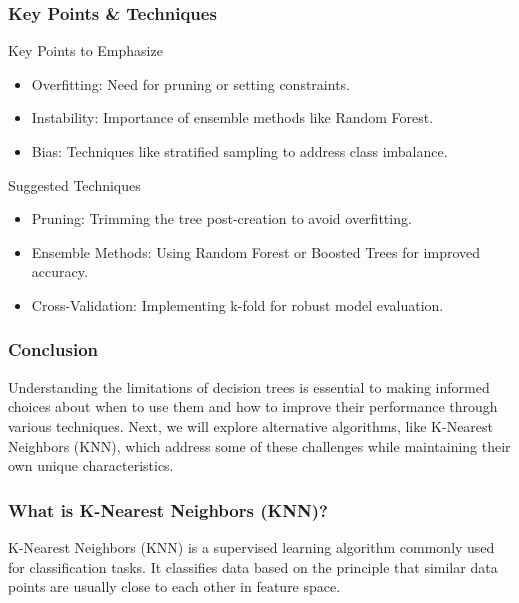 \documentclass[aspectratio=169]{beamer}
\begin{document}
\begin{frame}[fragile]
    \frametitle{Key Points & Techniques}
    \begin{block}{Key Points to Emphasize}
        \begin{itemize}
            \item Overfitting: Need for pruning or setting constraints.
            \item Instability: Importance of ensemble methods like Random Forest.
            \item Bias: Techniques like stratified sampling to address class imbalance.
        \end{itemize}
    \end{block}

    \begin{block}{Suggested Techniques}
        \begin{itemize}
            \item Pruning: Trimming the tree post-creation to avoid overfitting.
            \item Ensemble Methods: Using Random Forest or Boosted Trees for improved accuracy.
            \item Cross-Validation: Implementing k-fold for robust model evaluation.
        \end{itemize}
    \end{block}
\end{frame}

\begin{frame}[fragile]
    \frametitle{Conclusion}
    Understanding the limitations of decision trees is essential to making informed choices about when to use them and how to improve their performance through various techniques. Next, we will explore alternative algorithms, like K-Nearest Neighbors (KNN), which address some of these challenges while maintaining their own unique characteristics.
\end{frame}

\begin{frame}
    \frametitle{What is K-Nearest Neighbors (KNN)?}
    K-Nearest Neighbors (KNN) is a supervised learning algorithm commonly used for classification tasks. It classifies data based on the principle that similar data points are usually close to each other in feature space.
\end{frame}
\end{document}
